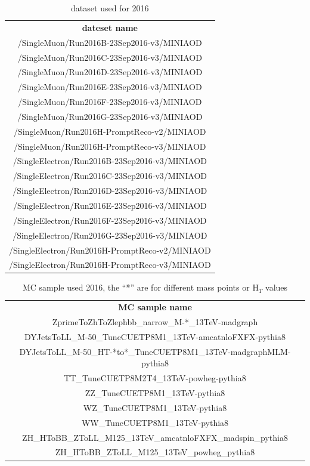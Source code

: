 \documentclass{article}
\newcommand\ChangeRT[1]{\noalign{\hrule height #1}}
\begin{document}
\begin{table}[]
\caption{dataset used for 2016}
\label{my-label}
\centering
\setlength{\tabcolsep}{8pt}
\begin{tabular}{ c }
\textbf{dateset name}     \\ \ChangeRT{1.5pt}
\hline
/SingleMuon/Run2016B-23Sep2016-v3/MINIAOD \\
/SingleMuon/Run2016C-23Sep2016-v3/MINIAOD \\
/SingleMuon/Run2016D-23Sep2016-v3/MINIAOD \\
/SingleMuon/Run2016E-23Sep2016-v3/MINIAOD \\
/SingleMuon/Run2016F-23Sep2016-v3/MINIAOD \\
/SingleMuon/Run2016G-23Sep2016-v3/MINIAOD \\
/SingleMuon/Run2016H-PromptReco-v2/MINIAOD \\
/SingleMuon/Run2016H-PromptReco-v3/MINIAOD \\ \hline
/SingleElectron/Run2016B-23Sep2016-v3/MINIAOD \\
/SingleElectron/Run2016C-23Sep2016-v3/MINIAOD \\
/SingleElectron/Run2016D-23Sep2016-v3/MINIAOD \\
/SingleElectron/Run2016E-23Sep2016-v3/MINIAOD \\
/SingleElectron/Run2016F-23Sep2016-v3/MINIAOD \\
/SingleElectron/Run2016G-23Sep2016-v3/MINIAOD \\
/SingleElectron/Run2016H-PromptReco-v2/MINIAOD \\
/SingleElectron/Run2016H-PromptReco-v3/MINIAOD \\ \hline
    
\end{tabular}
\end{table}



\begin{table}[]
\caption{MC sample used 2016, the ``*'' are for different mass points or H$_{T}$ values}
\label{my-label}
\centering
\setlength{\tabcolsep}{8pt}
\begin{tabular}{ c }
\textbf{MC sample name}     \\ \ChangeRT{1.5pt}
\hline

ZprimeToZhToZlephbb\_narrow\_M-*\_13TeV-madgraph \\
DYJetsToLL\_M-50\_TuneCUETP8M1\_13TeV-amcatnloFXFX-pythia8 \\
DYJetsToLL\_M-50\_HT-*to*\_TuneCUETP8M1\_13TeV-madgraphMLM-pythia8 \\
TT\_TuneCUETP8M2T4\_13TeV-powheg-pythia8 \\
ZZ\_TuneCUETP8M1\_13TeV-pythia8 \\
WZ\_TuneCUETP8M1\_13TeV-pythia8 \\
WW\_TuneCUETP8M1\_13TeV-pythia8 \\
ZH\_HToBB\_ZToLL\_M125\_13TeV\_amcatnloFXFX\_madspin\_pythia8 \\
ZH\_HToBB\_ZToLL\_M125\_13TeV\_powheg\_pythia8 \\

\end{tabular}
\end{table}
\end{document}
